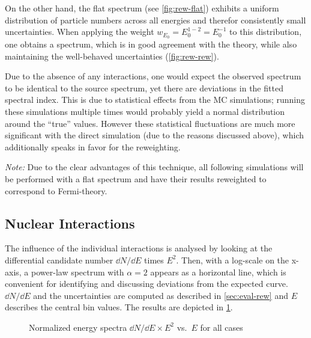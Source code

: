 On the other hand, the flat spectrum (see \cref{fig:rew-flat}) exhibits a
uniform distribution of particle numbers across all energies and therefor
consistently small uncertainties. When applying the weight
$w_{E_0}=E_0^{1-2}=E_0^{-1}$ to this distribution, one obtains a spectrum,
which is in good agreement with the theory, while also maintaining the
well-behaved uncertainties (\cref{fig:rew-rew}).

Due to the absence of any interactions, one would expect the observed spectrum
to be identical to the source spectrum, yet there are deviations in the fitted
spectral index. This is due to statistical effects from the MC simulations;
running these simulations multiple times would probably yield a normal
distribution around the \enquote{true} values. However these statistical
fluctuations are much more significant with the direct simulation (due to the
reasons discussed above), which additionally speaks in favor for the
reweighting.

\emph{Note:} Due to the clear advantages of this technique, all following
simulations will be performed with a flat spectrum and have their results
reweighted to correspond to Fermi-theory.


\subsection{Nuclear Interactions}
The influence of the individual interactions is analysed by looking at the
differential candidate number $\dd{N}/\dd{E}$ times $E^2$. Then, with a
log-scale on the x-axis, a power-law spectrum with $\alpha=2$ appears as a
horizontal line, which is convenient for identifying and discussing deviations
from the expected curve.
$\dd{N}/\dd{E}$ and the uncertainties are computed as described in
\cref{sec:eval-rew} and $E$ describes the central bin values. The results
are depicted in \cref{fig:interactions}.

\begin{figure}[ht!]
    \centering
    
    \caption{Normalized energy spectra $\dd{N}/\dd{E}\times{E^2}$ vs.~$E$ for
        all cases}
    \label{fig:interactions}
\end{figure}

